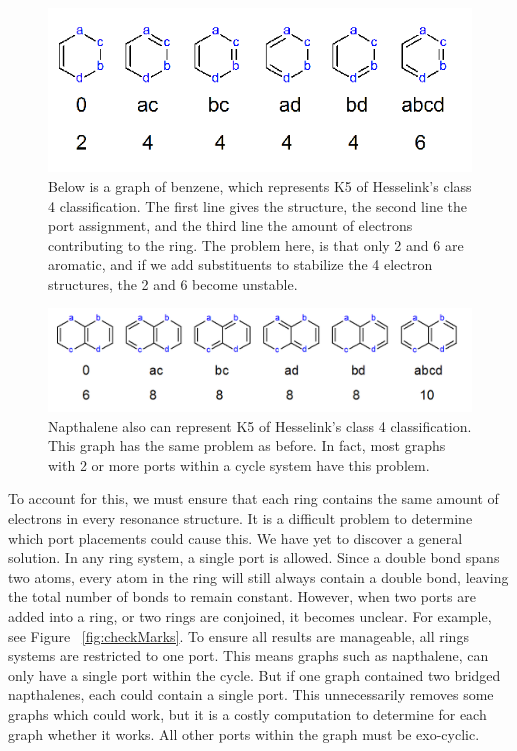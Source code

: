 \documentclass[12pt]{article}
\begin{document}
\begin{figure}[ht!]
\centering
\includegraphics[width=130mm]{noSenseBenzene.png}
\caption{Below is a graph of benzene, which represents K5 of Hesselink's class 4 classification. The first line gives the structure, the second line the port assignment, and the third line the amount of electrons contributing to the ring. The problem here, is that only 2 and 6 are aromatic, and if we add substituents to stabilize the 4 electron structures, the 2 and 6 become unstable. }
\label{fig:badBenzene}
\end{figure}

\begin{figure}[ht!]
\centering
\includegraphics[width=150mm]{noSenseNapthalene.png}
\caption{Napthalene also can represent K5 of Hesselink's class 4 classification. This graph has the same problem as before. In fact, most graphs with 2 or more ports within a cycle system have this problem.}
\label{fig:badNapthalene}
\end{figure}

To account for this, we must ensure that each ring contains the same amount of electrons in every resonance structure. It is a difficult problem to determine which port placements could cause this. We have yet to discover a general solution. In any ring system, a single port is allowed. Since a double bond spans two atoms, every atom in the ring will still always contain a double bond, leaving the total number of bonds to remain constant. However, when two ports are added into a ring, or two rings are conjoined, it becomes unclear. For example, see Figure ~\ref{fig:checkMarks}. To ensure all results are manageable, all rings systems are restricted to one port. This means graphs such as napthalene, can only have a single port within the cycle. But if one graph contained two bridged napthalenes, each could contain a single port. This unnecessarily removes some graphs which could work, but it is a costly computation to determine for each graph whether it works. All other ports within the graph must be exo-cyclic. 
\end{document}
